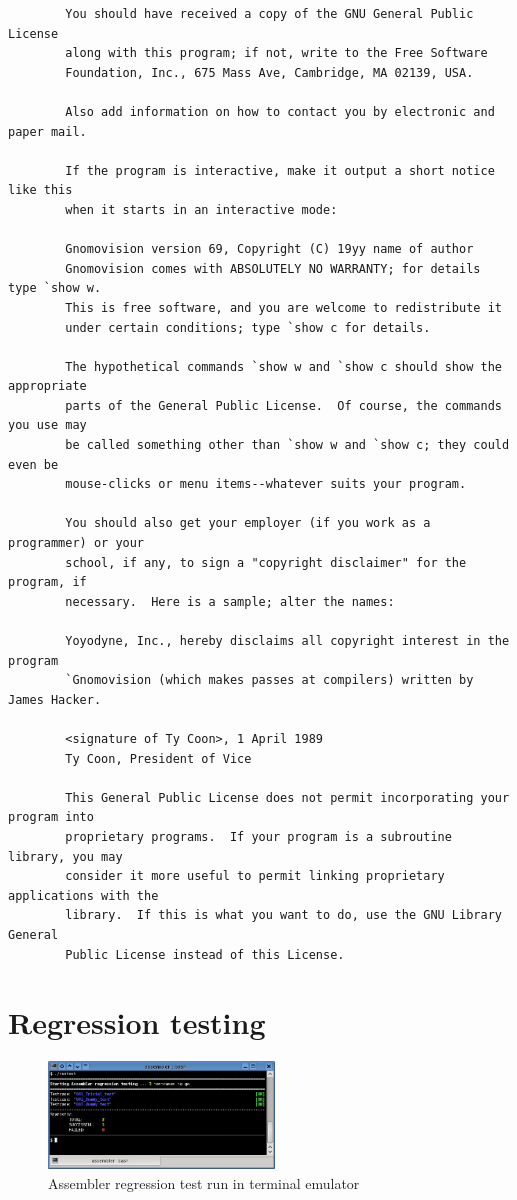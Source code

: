 \documentclass[a4paper,twoside,12pt]{book}
\begin{document}
{\begin{verbatim}
		You should have received a copy of the GNU General Public License
		along with this program; if not, write to the Free Software
		Foundation, Inc., 675 Mass Ave, Cambridge, MA 02139, USA.

		Also add information on how to contact you by electronic and paper mail.

		If the program is interactive, make it output a short notice like this
		when it starts in an interactive mode:

		Gnomovision version 69, Copyright (C) 19yy name of author
		Gnomovision comes with ABSOLUTELY NO WARRANTY; for details type `show w.
		This is free software, and you are welcome to redistribute it
		under certain conditions; type `show c for details.

		The hypothetical commands `show w and `show c should show the appropriate
		parts of the General Public License.  Of course, the commands you use may
		be called something other than `show w and `show c; they could even be
		mouse-clicks or menu items--whatever suits your program.

		You should also get your employer (if you work as a programmer) or your
		school, if any, to sign a "copyright disclaimer" for the program, if
		necessary.  Here is a sample; alter the names:

		Yoyodyne, Inc., hereby disclaims all copyright interest in the program
		`Gnomovision (which makes passes at compilers) written by James Hacker.

		<signature of Ty Coon>, 1 April 1989
		Ty Coon, President of Vice

		This General Public License does not permit incorporating your program into
		proprietary programs.  If your program is a subroutine library, you may
		consider it more useful to permit linking proprietary applications with the
		library.  If this is what you want to do, use the GNU Library General
		Public License instead of this License.
	\end{verbatim}
	}
\onecolumn

\chapter{Regression testing}
	\begin{figure}
		\centering{}
		\includegraphics[width=170pt]{img/030.png}
		\caption{Assembler regression test run in terminal emulator}
	\end{figure}
\end{document}
